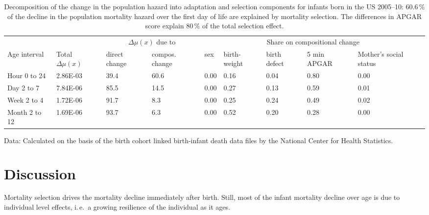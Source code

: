 \documentclass[12pt, parskip=half]{scrartcl}
\begin{document}
\begin{table}[!htb]
  \tabformat
  \begin{threeparttable}
    \begin{tabular}{ll*{2}{p{1cm}}*{5}{p{1cm}}}
      \toprule
       & & \multicolumn{2}{c}{$\Delta\mu(x)$ due to} & \multicolumn{5}{c}{Share on compositional change} \\
      \cmidrule(r){3-4}\cmidrule(l){5-9}
      Age interval & Total $\Delta\mu(x)$ & direct change & compos. change & sex & birth-weight & birth defect & 5 min APGAR & Mother's social status \\
      \midrule
      Hour 0 to 24 & 2.86E-03 & 39.4 & 60.6 & 0.00 & 0.16 & 0.04 & 0.80 & 0.00 \\
      Day 2 to 7 & 7.84E-06 & 85.5 & 14.5 & 0.00 & 0.27 & 0.13 & 0.59 & 0.01 \\
      Week 2 to 4 & 1.72E-06 & 91.7 & 8.3 & 0.00 & 0.25 & 0.24 & 0.49 & 0.02 \\
      Month 2 to 12 & 1.69E-06 & 93.7 & 6.3 & 0.00 & 0.52 & 0.20 & 0.28 & 0.00 \\
      \bottomrule
    \end{tabular}
    \begin{tablenotes} \tabfontsizefoot
      \item Data: Calculated on the basis of the birth cohort linked birth-infant death data files by the National Center for Health Statistics.
    \end{tablenotes}
    \caption{Decomposition of the change in the population hazard into adaptation and selection components for infants born in the US 2005--10: 60.6\,\% of the decline in the population mortality hazard over the first day of life are explained by mortality selection. The differences in APGAR score explain 80\,\% of the total selection effect.}
    \label{tab:decomp}
  \end{threeparttable}
\end{table}

\section{Discussion}

Mortality selection drives the mortality decline immediately after birth. Still, most of the infant mortality decline over age is due to individual level effects, i.\,e.~a growing resilience of the individual as it ages.

\clearpage


\sloppy
\printbibliography



\end{document}
